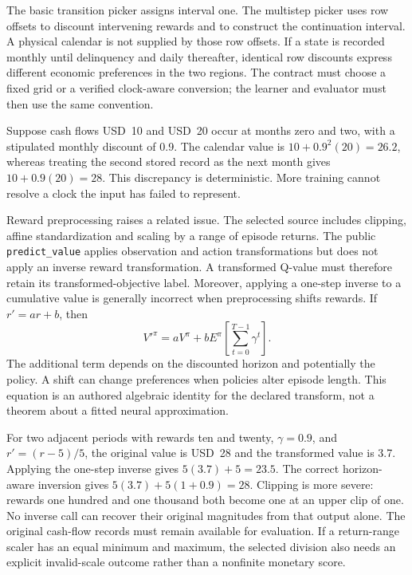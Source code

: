 The basic transition picker assigns interval one. The multistep picker uses
row offsets to discount intervening rewards and to construct the continuation
interval. A physical calendar is not supplied by those row offsets. If a
state is recorded monthly until delinquency and daily thereafter, identical
row discounts express different economic preferences in the two regions.
The contract must choose a fixed grid or a verified clock-aware conversion;
the learner and evaluator must then use the same convention.
\citep{exec15_d3rlpy_episode,exec15_d3rlpy_contract}

Suppose cash flows USD~10 and USD~20 occur at months zero and two, with a
stipulated monthly discount of 0.9. The calendar value is
\(10+0.9^2(20)=26.2\), whereas treating the second stored record as the next
month gives \(10+0.9(20)=28\). This discrepancy is deterministic. More
training cannot resolve a clock the input has failed to represent.
\citep{exec15_d3rlpy_exact}

Reward preprocessing raises a related issue. The selected source includes
clipping, affine standardization and scaling by a range of episode returns.
The public \texttt{predict\_value} applies observation and action
transformations but does not apply an inverse reward transformation.
A transformed Q-value must therefore retain its transformed-objective label.
Moreover, applying a one-step inverse to a cumulative value is generally
incorrect when preprocessing shifts rewards. If \(r'=a r+b\), then
\[
 V'^{\pi}=a V^{\pi}+b E^{\pi}
                 \left[\sum_{t=0}^{T-1}\gamma^t\right].
\]
The additional term depends on the discounted horizon and potentially the
policy. A shift can change preferences when policies alter episode length.
This equation is an authored algebraic identity for the declared transform,
not a theorem about a fitted neural approximation.
\citep{exec15_d3rlpy_value,exec15_d3rlpy_exact}

For two adjacent periods with rewards ten and twenty, \(\gamma=0.9\), and
\(r'=(r-5)/5\), the original value is USD~28 and the transformed value is
3.7. Applying the one-step inverse gives \(5(3.7)+5=23.5\). The correct
horizon-aware inversion gives \(5(3.7)+5(1+0.9)=28\). Clipping is more
severe: rewards one hundred and one thousand both become one at an upper
clip of one. No inverse call can recover their original magnitudes from that
output alone. The original cash-flow records must remain available for
evaluation. If a return-range scaler has an equal minimum and maximum, the
selected division also needs an explicit invalid-scale outcome rather than a
nonfinite monetary score. \citep{exec15_d3rlpy_value,exec15_d3rlpy_exact}


